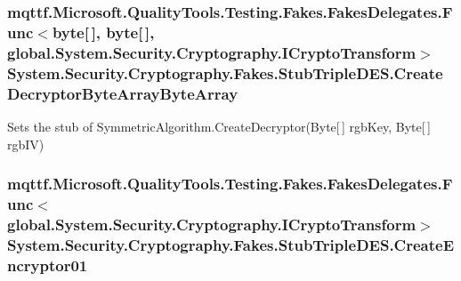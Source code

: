 \hypertarget{class_system_1_1_security_1_1_cryptography_1_1_fakes_1_1_stub_triple_d_e_s_aab98b577d2b3a5e6c5e368604197b774}{
\subsubsection[{Create\-Decryptor\-Byte\-Array\-Byte\-Array}]{\setlength{\rightskip}{0pt plus 5cm}mqttf.\-Microsoft.\-Quality\-Tools.\-Testing.\-Fakes.\-Fakes\-Delegates.\-Func$<$byte\mbox{[}$\,$\mbox{]}, byte\mbox{[}$\,$\mbox{]}, global.\-System.\-Security.\-Cryptography.\-I\-Crypto\-Transform$>$ System.\-Security.\-Cryptography.\-Fakes.\-Stub\-Triple\-D\-E\-S.\-Create\-Decryptor\-Byte\-Array\-Byte\-Array}}\label{class_system_1_1_security_1_1_cryptography_1_1_fakes_1_1_stub_triple_d_e_s_aab98b577d2b3a5e6c5e368604197b774}


Sets the stub of Symmetric\-Algorithm.\-Create\-Decryptor(\-Byte\mbox{[}$\,$\mbox{]} rgb\-Key, Byte\mbox{[}$\,$\mbox{]} rgb\-I\-V)

\hypertarget{class_system_1_1_security_1_1_cryptography_1_1_fakes_1_1_stub_triple_d_e_s_a4ed804d2252fc94844be8ef6240b4984}{
\subsubsection[{Create\-Encryptor01}]{\setlength{\rightskip}{0pt plus 5cm}mqttf.\-Microsoft.\-Quality\-Tools.\-Testing.\-Fakes.\-Fakes\-Delegates.\-Func$<$global.\-System.\-Security.\-Cryptography.\-I\-Crypto\-Transform$>$ System.\-Security.\-Cryptography.\-Fakes.\-Stub\-Triple\-D\-E\-S.\-Create\-Encryptor01}}\label{class_system_1_1_security_1_1_cryptography_1_1_fakes_1_1_stub_triple_d_e_s_a4ed804d2252fc94844be8ef6240b4984}


